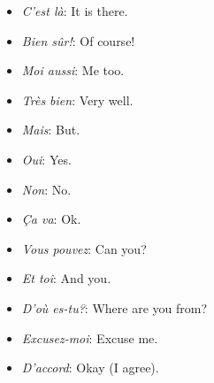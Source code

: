 \begin{itemize}
\item{\emph{C'est l\`a}: It is there.}

\item{\emph{Bien s\^ur!}: Of course!} 

\item{\emph{Moi aussi}: Me too.} 

\item{\emph{Tr\`es bien}: Very well.} 

\item{\emph{Mais}: But.}

\item{\emph{Oui}: Yes.} 

\item{\emph{Non}: No.}

\item{\emph{\c{C}a va}: Ok.} 

\item{\emph{Vous pouvez}: Can you?}

\item{\emph{Et toi}: And you.}

\item{\emph{D'o\`u es-tu?}: Where are you from?}

\item{\emph{Excusez-moi}: Excuse me.}

\item{\emph{D'accord}: Okay (I agree).}

\end{itemize}
